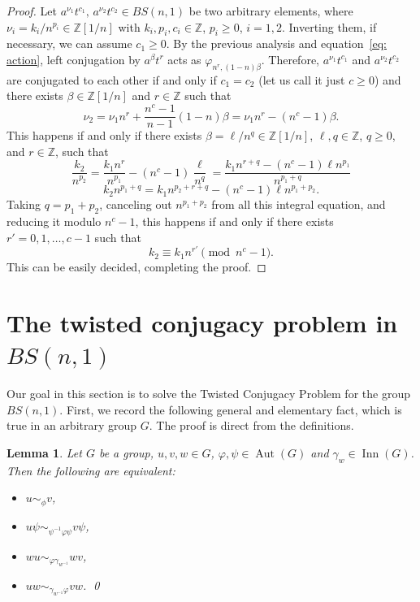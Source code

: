 \documentclass[english]{amsart}
\newtheorem{lem}[thm]{Lemma}
\theoremstyle{definition}
\newcommand\ZZ{\mathbb{Z}}
\newcommand{\Aut}{\operatorname{Aut}}
\newcommand{\Inn}{\operatorname{Inn}}
\begin{document}
\begin{proof}
Let $a^{\nu_1}t^{c_1},\, a^{\nu_2}t^{c_2}\in BS(n,1)$ be two arbitrary elements, where $\nu_i =k_i/n^{p_i}\in \ZZ[1/n]$ with $k_i, p_i, c_i\in \ZZ$, $p_i\geq 0$, $i=1,2$. Inverting them, if necessary, we can assume $c_1\geq 0$. By the previous analysis and equation~\eqref{eq: action}, left conjugation by $a^{\beta}t^r$ acts as 
$\varphi_{n^r,(1-n)\beta}$. Therefore, $a^{\nu_1}t^{c_1}$ and $a^{\nu_2}t^{c_2}$ are conjugated to each other if and only if $c_1=c_2$ (let us call it just $c\geq 0$) and there exists $\beta\in \ZZ[1/n]$ and $r\in \ZZ$ such that 
 $$
\nu_2 =\nu_1 n^r +\frac{n^c-1}{n-1}(1-n)\beta =\nu_1 n^r -(n^c-1)\beta.
 $$
This happens if and only if there exists $\beta=\ell/n^q\in \ZZ[1/n]$, $\ell,q\in \ZZ$, $q\geq 0$, and $r\in \ZZ$, such that 
 $$
\frac{k_2}{n^{p_2}}= \frac{k_1 n^r}{n^{p_1}}-(n^c-1)\frac{\ell}{n^{q}}=\frac{k_1n^{r+q}-(n^c-1)\ell n^{p_1}}{n^{p_1+q}}
 $$
 $$
k_2 n^{p_1+q}=k_1n^{p_2+r+q}-(n^c-1)\ell n^{p_1+p_2}.
 $$
Taking $q=p_1+p_2$, canceling out $n^{p_1+p_2}$ from all this integral equation, and reducing it modulo $n^c-1$, this happens if and only if there exists $r'=0,1,\ldots ,c-1$ such that 
 $$
k_2 \equiv k_1 n^{r'} \pmod{n^c-1}.
 $$
This can be easily decided, completing the proof. 
%
\end{proof}

\section{The twisted conjugacy problem in $BS(n,1)$}\label{sec: TCP}

Our goal in this section is to solve the Twisted Conjugacy Problem for the group $BS(n,1)$. First, we record the following general and elementary fact, which is true in an arbitrary group $G$. The proof is direct from the definitions.

\begin{lem} \label{lem: twisted autos}
Let $G$ be a group, $u,v,w \in G$, $\varphi, \psi \in \Aut(G)$ and $\gamma_w \in \Inn(G)$. Then the following are equivalent:
 \begin{itemize}
\item[(i)] $u \sim_\phi v$,
\item[(ii)] $u \psi \sim_{\psi^{-1}\varphi\psi} v \psi$,
\item[(iii)] $wu \sim_{\varphi\gamma_{w^{-1}}} wv$, \item[(iv)] $uw \sim_{\gamma_{w^{-1}}\varphi} vw$. \hfill \qed
 \end{itemize}
\end{lem}
\end{document}
